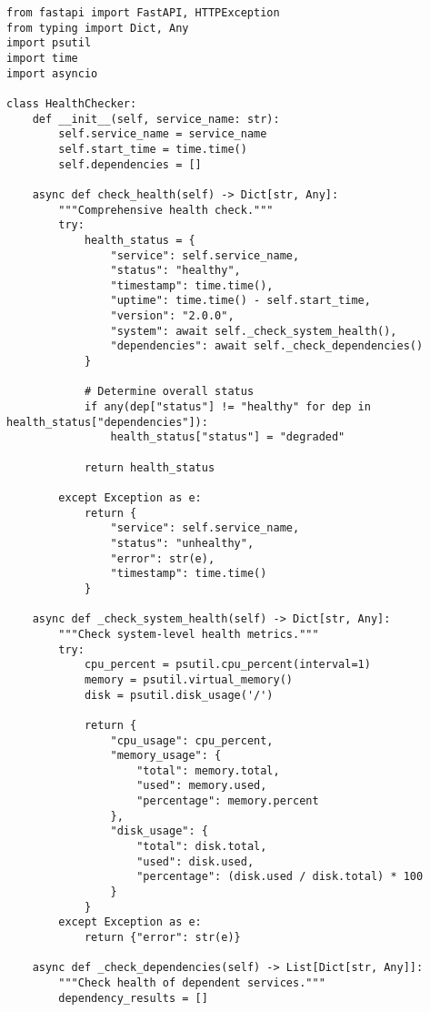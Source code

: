\begin{lstlisting}[style=pythoncode, caption=Service Health Check Implementation]
from fastapi import FastAPI, HTTPException
from typing import Dict, Any
import psutil
import time
import asyncio

class HealthChecker:
    def __init__(self, service_name: str):
        self.service_name = service_name
        self.start_time = time.time()
        self.dependencies = []
    
    async def check_health(self) -> Dict[str, Any]:
        """Comprehensive health check."""
        try:
            health_status = {
                "service": self.service_name,
                "status": "healthy",
                "timestamp": time.time(),
                "uptime": time.time() - self.start_time,
                "version": "2.0.0",
                "system": await self._check_system_health(),
                "dependencies": await self._check_dependencies()
            }
            
            # Determine overall status
            if any(dep["status"] != "healthy" for dep in health_status["dependencies"]):
                health_status["status"] = "degraded"
            
            return health_status
            
        except Exception as e:
            return {
                "service": self.service_name,
                "status": "unhealthy",
                "error": str(e),
                "timestamp": time.time()
            }
    
    async def _check_system_health(self) -> Dict[str, Any]:
        """Check system-level health metrics."""
        try:
            cpu_percent = psutil.cpu_percent(interval=1)
            memory = psutil.virtual_memory()
            disk = psutil.disk_usage('/')
            
            return {
                "cpu_usage": cpu_percent,
                "memory_usage": {
                    "total": memory.total,
                    "used": memory.used,
                    "percentage": memory.percent
                },
                "disk_usage": {
                    "total": disk.total,
                    "used": disk.used,
                    "percentage": (disk.used / disk.total) * 100
                }
            }
        except Exception as e:
            return {"error": str(e)}
    
    async def _check_dependencies(self) -> List[Dict[str, Any]]:
        """Check health of dependent services."""
        dependency_results = []
        

\end{lstlisting}
